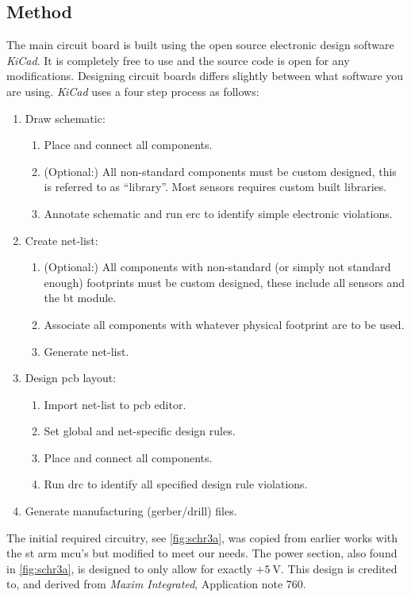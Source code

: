 \subsection{Method}
The main circuit board is built using the open source electronic design software \emph{KiCad}\cite{kicad}. It is completely free to use and the source code is open for any modifications.
Designing circuit boards differs slightly between what software you are using. \emph{KiCad} uses a four step process as follows:
\begin{enumerate}[noitemsep]
\item Draw schematic:
	\begin{enumerate}[noitemsep]
	\item Place and connect all components.
	\item (Optional:) All non-standard components must be custom designed, this is referred to as ``library''. Most sensors requires custom built libraries.
	\item Annotate schematic and run \gls{erc} to identify simple electronic violations.
	\end{enumerate}
\item Create net-list:
	\begin{enumerate}[noitemsep]
	\item (Optional:) All components with non-standard (or simply not standard enough) footprints must be custom designed, these include all sensors and the \gls{bt} module.
	\item Associate all components with whatever physical footprint are to be used.
	\item Generate net-list.
	\end{enumerate}
\item Design \gls{pcb} layout:
	\begin{enumerate}[noitemsep]
	\item Import net-list to \gls{pcb} editor.
	\item Set global and net-specific design rules.
	\item Place and connect all components.
	\item Run \gls{drc} to identify all specified design rule violations.
	\end{enumerate}
\item Generate manufacturing (gerber/drill) files.
\end{enumerate}
The initial required circuitry, see \autoref{fig:schr3a}, was copied from earlier works with the \gls{st} \gls{arm} \gls{mcu}'s but modified to meet our needs. The power section, also found in \autoref{fig:schr3a}, is designed to only allow for exactly $+5~\textrm{V}$. This design is credited to, and derived from \emph{Maxim Integrated}, Application note 760\cite{overprotection}.

